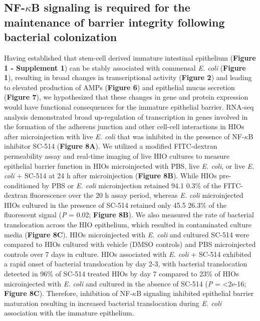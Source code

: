 \documentclass[9pt,lineo]{elife}
\begin{document}
\subsection*{{\bfseries\sffamily } NF-\(\kappa\)B signaling is required for the maintenance of barrier integrity following bacterial colonization}
\label{sec:orgheadline10}
Having established that stem-cell derived immature intestinal epithelium (\textbf{Figure 1 - Supplement 1}) can be stably associated with commensal \emph{E. coli} (\textbf{Figure 1}), resulting in broad changes in transcriptional activity (\textbf{Figure 2}) and leading to elevated production of AMPs (\textbf{Figure 6}) and epithelial mucus secretion (\textbf{Figure 7}), we hypothesized that these changes in gene and protein expression would have functional consequences for the immature epithelial barrier. RNA-seq analysis demonstrated broad up-regulation of transcription in genes involved in the formation of the adherens junction and other cell-cell interactions in HIOs after microinjection with live \emph{E. coli} that was inhibited in the presence of NF-\(\kappa\)B inhibitor SC-514 (\textbf{Figure 8A}). We utilized a modified FITC-dextran permeability assay \citep{Leslie:2015} and real-time imaging of live HIO cultures to measure epithelial barrier function in HIOs microinjected with PBS, live \emph{E. coli}, or live \emph{E. coli} + SC-514 at 24 h after microinjection (\textbf{Figure 8B}). While HIOs pre-conditioned by PBS or \emph{E. coli} microinjection retained 94.1 \textpm{} 0.3\% of the FITC-dextran fluorescence over the 20 h assay period, whereas \emph{E. coli} microinjected HIOs cultured in the presence of SC-514 retained only 45.5 \textpm{} 26.3\% of the fluorescent signal (\emph{P} = 0.02; \textbf{Figure 8B}). We also measured the rate of bacterial translocation across the HIO epithelium, which resulted in contaminated culture media (\textbf{Figure 8C}). HIOs microinjected with \emph{E. coli} and cultured \textpm{} SC-514 were compared to HIOs cultured with vehicle (DMSO controls) and PBS microinjected controls over 7 days in culture. HIOs associated with \emph{E. coli} + SC-514 exhibited a rapid onset of bacterial translocation by day 2-3, with bacterial translocation detected in 96\% of SC-514 treated HIOs by day 7 compared to 23\% of HIOs microinjected with \emph{E. coli} and cultured in the absence of SC-514 (\emph{P} = \num{<2e-16}; \textbf{Figure 8C}). Therefore, inhibition of NF-\(\kappa\)B signaling inhibited epithelial barrier maturation resulting in increased bacterial translocation during \emph{E. coli} association with the immature epithelium.
\end{document}
